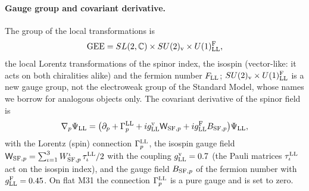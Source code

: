 \documentclass[aps,prd,twocolumn,superscriptaddress,nofootinbib,floatfix,longbibliography]{revtex4-2}
\newcommand{\LL}{{\rm LL}}
\newcommand{\SF}{{\rm SF}}
\begin{document}
\paragraph*{Gauge group and covariant derivative.}
The group of the local transformations is
\begin{equation}
\mathrm{GEE}=SL(2,\mathbb C)\times SU(2)_{\rm v}\times U(1)^{\rm F}_\LL ,
\label{eq:GEE}
\end{equation}
the local Lorentz transformations of the spinor index, the isospin (vector-like: it acts on both chiralities alike) and
the fermion number $F_\LL$; $SU(2)_{\rm v}\times U(1)^{\rm F}_\LL$ is a new gauge group, not the electroweak group of the
Standard Model, whose names we borrow for analogous objects only. The covariant derivative of the spinor field is
\begin{equation}
\nabla_p\Psi_\LL=\big(\partial_p+\Gamma^\LL_p+ig^{\rm v}_\LL\mathsf W_{\SF,p}+ig^{\rm F}_\LL B_{\SF,p}\big)\Psi_\LL ,
\label{eq:cov}
\end{equation}
with the Lorentz (spin) connection $\Gamma^\LL_p$, the isospin gauge field
$\mathsf W_{\SF,p}=\sum_{\iota=1}^3W^\iota_{\SF,p}\,\tau^\LL_\iota/2$ with the coupling
$g^{\rm v}_\LL=0.7$ (the Pauli matrices $\tau^\LL_\iota$ act on the isospin index), and the gauge field $B_{\SF,p}$ of the
fermion number with $g^{\rm F}_\LL=0.45$. On flat M31 the connection $\Gamma^\LL_p$ is a pure gauge and is set to zero.
\end{document}
